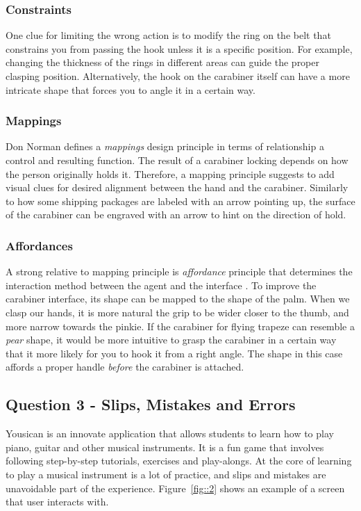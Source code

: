 \documentclass[12pt,letterpaper]{article}
\begin{document}
\subsubsection*{Constraints}
One clue for limiting the wrong action is to modify the ring on the belt that constrains you from passing the hook unless it is a specific position. For example, changing the thickness of the rings in different areas can guide the proper clasping position. Alternatively, the hook on the carabiner itself can have a more intricate shape that forces you to angle it in a certain way.

\subsubsection*{Mappings}
Don Norman defines a  \textit{mappings} design principle in terms of relationship a control and resulting function\cite{norman2013design}. The result of a carabiner locking depends on how the person originally holds it. Therefore, a mapping principle suggests to add visual clues for desired alignment between the hand and the carabiner. Similarly to how some shipping packages are labeled with an arrow pointing up, the surface of the carabiner can be engraved with an arrow to hint on the direction of hold.    

\subsubsection*{Affordances}
A strong relative to mapping principle is \textit{affordance} principle that determines the interaction method between the agent and the interface \cite{norman2013design}. To improve the carabiner interface, its shape can be mapped to the shape of the palm. When we clasp our hands, it is more natural the grip to be wider closer to the thumb, and more narrow towards the pinkie. If the carabiner for flying trapeze can resemble a \textit{pear} shape, it would be more intuitive to grasp the carabiner in a certain way that it more likely for you to hook it from a right angle. The shape in this case affords a proper handle \textit{before} the carabiner is attached.


\subsection*{Question 3 - Slips, Mistakes and Errors}
Yousican is an innovate application that allows students to learn how to play piano, guitar and other musical instruments\cite{eli2017yousician}. It is a fun game that involves following step-by-step tutorials, exercises and play-alongs. At the core of learning to play a musical instrument is a lot of practice, and slips and mistakes are unavoidable part of the experience. Figure~\ref{fig::2} shows an example of a screen that user interacts with.
\end{document}
